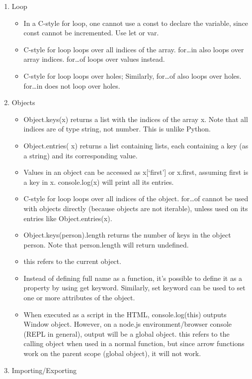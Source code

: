 \documentclass[a4paper]{article}
\begin{document}
\begin{enumerate}
\begin{itemize}
    \end{itemize}
    \item Loop
    \begin{itemize}
    \item In a C-style for loop, one cannot use a const to declare the variable, since const cannot be incremented. Use let  or var.
   \item C-style for loop  loops over all indices of the array. for…in  also loops over array indices. for…of loops over values  instead.
   \item C-style for loop loops over holes; Similarly, for…of  also loops over holes. for…in  does not loop over holes.
   \end{itemize}
   \item Objects
   \begin{itemize}
   \item Object.keys(x) returns a list with the indices of the array x. Note that all indices are of type string, not number. This is unlike Python.
   \item Object.entries( x) returns a list containing lists, each containing a key (as a string) and its corresponding value.
   \item Values in an object can be accessed as x[‘first’]  or x.first, assuming first  is a key in x. console.log(x)  will print all its entries.
   \item C-style for loop  loops over all indices of the object. for…of cannot be used with objects directly (because objects are not iterable), unless used on its entries like Object.entries(x).
   \item Object.keys(person).length returns the number of keys in the object person. Note that person.length  will return undefined.
   \item this refers to the current object.
   \item Instead of defining full name as a function, it’s possible to define it as a property by using get keyword. Similarly, set  keyword can be used to set one or more attributes of the object.
   \item When executed as a script in the HTML, console.log(this) outputs Window  object. However, on a node.js environment/browser console (REPL in general), output will be a global  object.
   this  refers to the calling object when used in a normal function, but since arrow functions work on the parent scope  (global object), it will not work.
   \end{itemize}
   \item Importing/Exporting

\end{enumerate}
\end{document}
